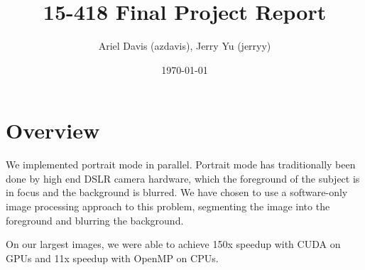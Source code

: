 \documentclass[12pt]{article}
\author{Ariel Davis (azdavis), Jerry Yu (jerryy)}
\date{\today}
\title{15-418 Final Project Report}
\begin{document}
\maketitle

\section{Overview}

We implemented portrait mode in parallel.
Portrait mode has traditionally been done by high end DSLR camera hardware,
which the foreground of the subject is in focus and the background is blurred.
We have chosen to use a software-only image processing approach to this problem,
segmenting the image into the foreground and blurring the background.

On our largest images, we were able to achieve 150x speedup with CUDA on GPUs
and 11x speedup with OpenMP on CPUs.
\end{document}
